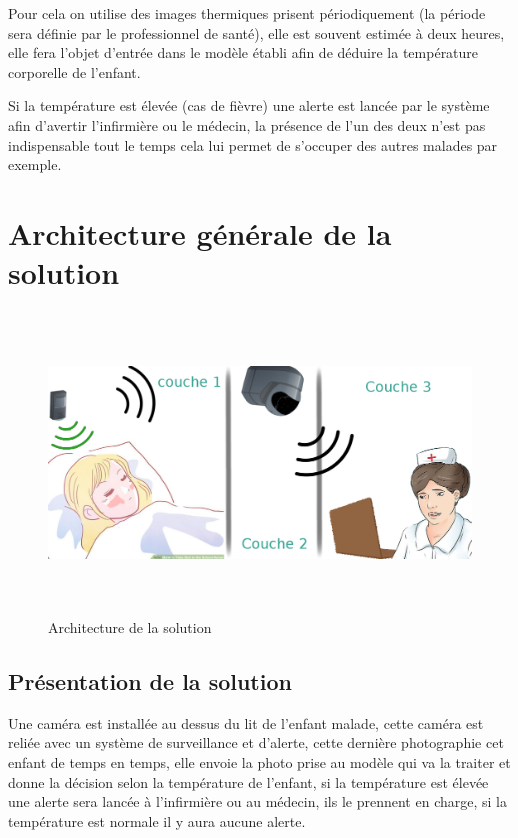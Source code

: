 \documentclass[12pt]{article}
\begin{document}
Pour cela on utilise des images thermiques prisent périodiquement (la période sera définie par le professionnel de santé), elle est souvent estimée à deux heures, elle fera l’objet d’entrée dans le modèle établi afin de déduire la température corporelle de l’enfant.

Si la température est élevée (cas de fièvre) une alerte est lancée par le système afin d’avertir l'infirmière ou le médecin, la présence de l'un des deux n'est pas indispensable tout le temps cela lui permet de s’occuper des autres malades par exemple.
\section{Architecture générale de la solution}
\begin{figure}[h]
	\centering
	\includegraphics[height=8cm,width=15cm]{img-Chapiter-3/processus.png}
	\caption{Architecture de la solution}
	\label{fig:archgene}
\end{figure}
\newpage
\subsection{Présentation de la solution}
Une caméra est installée au dessus du lit de l'enfant malade, cette caméra est reliée avec un système de surveillance et d'alerte, cette dernière photographie cet enfant de temps en temps, elle envoie la photo prise au modèle qui va la traiter et donne la décision selon la température de l'enfant, si la température est élevée une alerte sera lancée à l'infirmière ou au médecin, ils le prennent en charge, si la température est normale il y aura aucune alerte.
\end{document}
